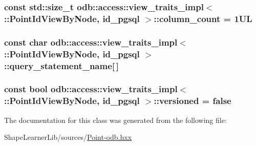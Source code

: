 \subsubsection[{column\+\_\+count}]{\setlength{\rightskip}{0pt plus 5cm}const std\+::size\+\_\+t odb\+::access\+::view\+\_\+traits\+\_\+impl$<$ \+::{\bf Point\+Id\+View\+By\+Node}, id\+\_\+pgsql $>$\+::column\+\_\+count = 1\+U\+L\hspace{0.3cm}{\ttfamily [static]}}\label{classodb_1_1access_1_1view__traits__impl_3_01_1_1_point_id_view_by_node_00_01id__pgsql_01_4_a8a6589faac6def91e0d6aea4600bdd4d}
\hypertarget{classodb_1_1access_1_1view__traits__impl_3_01_1_1_point_id_view_by_node_00_01id__pgsql_01_4_a42a65b1c29441e287c57758140a0cd27}{}
\subsubsection[{query\+\_\+statement\+\_\+name}]{\setlength{\rightskip}{0pt plus 5cm}const char odb\+::access\+::view\+\_\+traits\+\_\+impl$<$ \+::{\bf Point\+Id\+View\+By\+Node}, id\+\_\+pgsql $>$\+::query\+\_\+statement\+\_\+name\mbox{[}$\,$\mbox{]}\hspace{0.3cm}{\ttfamily [static]}}\label{classodb_1_1access_1_1view__traits__impl_3_01_1_1_point_id_view_by_node_00_01id__pgsql_01_4_a42a65b1c29441e287c57758140a0cd27}
\hypertarget{classodb_1_1access_1_1view__traits__impl_3_01_1_1_point_id_view_by_node_00_01id__pgsql_01_4_a587654819c455d3c4190e3409122850e}{}
\subsubsection[{versioned}]{\setlength{\rightskip}{0pt plus 5cm}const bool odb\+::access\+::view\+\_\+traits\+\_\+impl$<$ \+::{\bf Point\+Id\+View\+By\+Node}, id\+\_\+pgsql $>$\+::versioned = false\hspace{0.3cm}{\ttfamily [static]}}\label{classodb_1_1access_1_1view__traits__impl_3_01_1_1_point_id_view_by_node_00_01id__pgsql_01_4_a587654819c455d3c4190e3409122850e}


The documentation for this class was generated from the following file\+:\begin{DoxyCompactItemize}
\item 
Shape\+Learner\+Lib/sources/\hyperlink{_point-odb_8hxx}{Point-\/odb.\+hxx}\end{DoxyCompactItemize}
